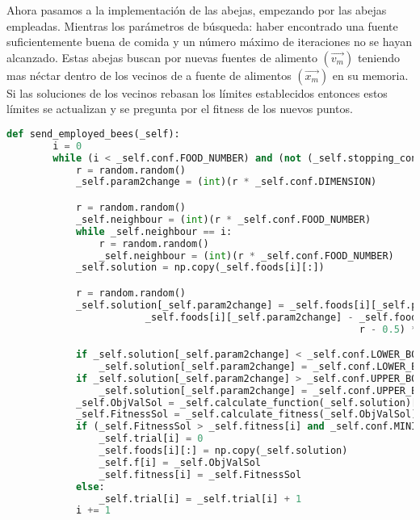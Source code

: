 \documentclass{article}
\begin{document}
Ahora pasamos a la implementación de las abejas, empezando por las abejas empleadas. Mientras los parámetros de búsqueda: haber encontrado una fuente suficientemente buena de comida y un número máximo de iteraciones no se hayan alcanzado. Estas abejas buscan por nuevas fuentes de alimento $(\vec{v_m})$ teniendo mas néctar dentro de los vecinos de a fuente de alimentos $(\vec{x_m})$ en su memoria. Si las soluciones de los vecinos rebasan los límites establecidos entonces estos límites se actualizan y se pregunta por el fitness de los nuevos puntos.

\begin{lstlisting}[language=Python]
    def send_employed_bees(_self):
        i = 0
        while (i < _self.conf.FOOD_NUMBER) and (not (_self.stopping_condition())):
            r = random.random()
            _self.param2change = (int)(r * _self.conf.DIMENSION)

            r = random.random()
            _self.neighbour = (int)(r * _self.conf.FOOD_NUMBER)
            while _self.neighbour == i:
                r = random.random()
                _self.neighbour = (int)(r * _self.conf.FOOD_NUMBER)
            _self.solution = np.copy(_self.foods[i][:])

            r = random.random()
            _self.solution[_self.param2change] = _self.foods[i][_self.param2change] + (
                        _self.foods[i][_self.param2change] - _self.foods[_self.neighbour][_self.param2change]) * (
                                                             r - 0.5) * 2

            if _self.solution[_self.param2change] < _self.conf.LOWER_BOUND:
                _self.solution[_self.param2change] = _self.conf.LOWER_BOUND
            if _self.solution[_self.param2change] > _self.conf.UPPER_BOUND:
                _self.solution[_self.param2change] = _self.conf.UPPER_BOUND
            _self.ObjValSol = _self.calculate_function(_self.solution)[0]
            _self.FitnessSol = _self.calculate_fitness(_self.ObjValSol)
            if (_self.FitnessSol > _self.fitness[i] and _self.conf.MINIMIZE == True) or (_self.FitnessSol <= _self.fitness[i] and _self.conf.MINIMIZE == False):
                _self.trial[i] = 0
                _self.foods[i][:] = np.copy(_self.solution)
                _self.f[i] = _self.ObjValSol
                _self.fitness[i] = _self.FitnessSol
            else:
                _self.trial[i] = _self.trial[i] + 1
            i += 1
\end{lstlisting}
\end{document}
